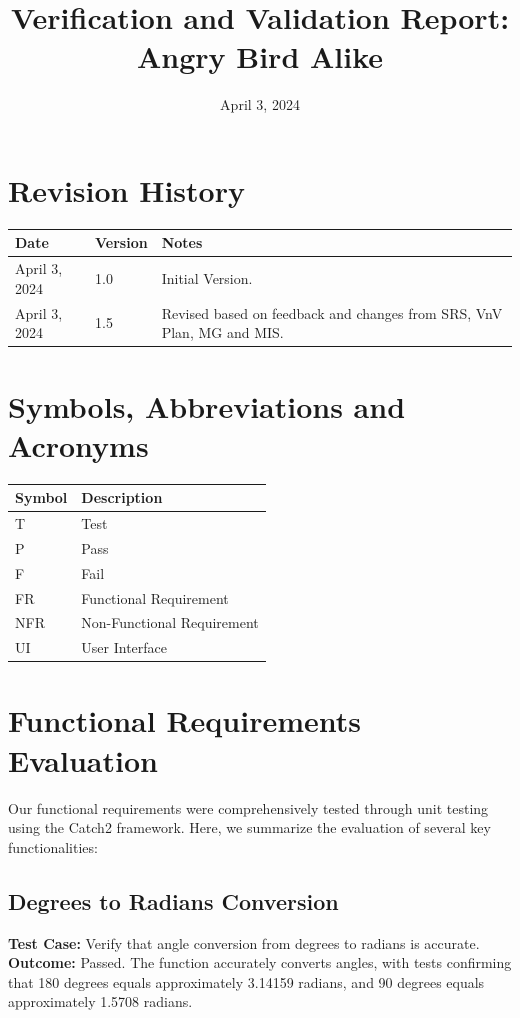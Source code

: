 \documentclass[12pt]{article}
\title{Verification and Validation Report: Angry Bird Alike}
\date{April 3, 2024}
\begin{document}
\maketitle

\newpage
\tableofcontents
\listoftables
\listoffigures
\newpage

\section*{Revision History}
\begin{longtable}{|p{2cm}|p{2cm}|p{10cm}|}
    \hline
    \textbf{Date} & \textbf{Version} & \textbf{Notes} \\
    \hline
    April 3, 2024 & 1.0 & Initial Version.\\\hline
    April 3, 2024 & 1.5 & Revised based on feedback and changes from SRS, VnV Plan, MG and MIS.\\
    \hline
\end{longtable}
\FloatBarrier

\newpage
\section*{Symbols, Abbreviations and Acronyms}
\begin{tabular}{|l|l|}
\hline
Symbol & Description \\
\hline
T & Test \\
\hline
P & Pass\\
\hline
F & Fail\\
\hline
FR & Functional Requirement \\
\hline
NFR & Non-Functional Requirement \\
\hline
UI & User Interface \\
\hline\hline
\end{tabular}
\FloatBarrier

\section{Functional Requirements Evaluation}

Our functional requirements were comprehensively tested through unit testing using the Catch2 framework. Here, we summarize the evaluation of several key functionalities:

\subsection{Degrees to Radians Conversion}
\textbf{Test Case:} Verify that angle conversion from degrees to radians is accurate. \\
\textbf{Outcome:} Passed. The function accurately converts angles, with tests confirming that 180 degrees equals approximately 3.14159 radians, and 90 degrees equals approximately 1.5708 radians.
\end{document}
